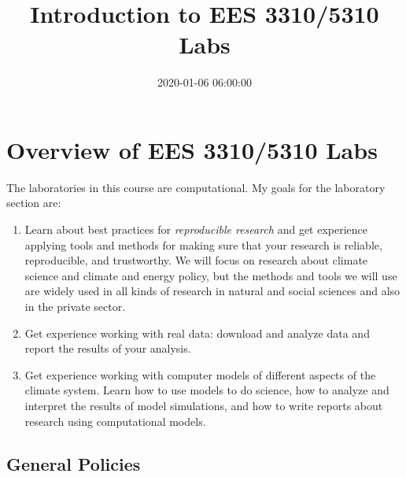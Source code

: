 \documentclass[
]{article}
\title{Introduction to EES 3310/5310 Labs}
\author{}
\date{\vspace{-2.5em}2020-01-06 06:00:00}
\providecommand{\tightlist}{%
  \setlength{\itemsep}{0pt}\setlength{\parskip}{0pt}}
\begin{document}
\maketitle

{
\setcounter{tocdepth}{2}
\tableofcontents
}
\hypertarget{overview-of-ees-33105310-labs}{%
\section{Overview of EES 3310/5310
Labs}\label{overview-of-ees-33105310-labs}}

The laboratories in this course are computational. My goals for the
laboratory section are:

\begin{enumerate}
\def\labelenumi{\arabic{enumi}.}
\tightlist
\item
  Learn about best practices for \emph{reproducible research} and get
  experience applying tools and methods for making sure that your
  research is reliable, reproducible, and trustworthy. We will focus on
  research about climate science and climate and energy policy, but the
  methods and tools we will use are widely used in all kinds of research
  in natural and social sciences and also in the private sector.
\item
  Get experience working with real data: download and analyze data and
  report the results of your analysis.
\item
  Get experience working with computer models of different aspects of
  the climate system. Learn how to use models to do science, how to
  analyze and interpret the results of model simulations, and how to
  write reports about research using computational models.
\end{enumerate}

\hypertarget{general-policies}{%
\subsection{General Policies}\label{general-policies}}
\end{document}
